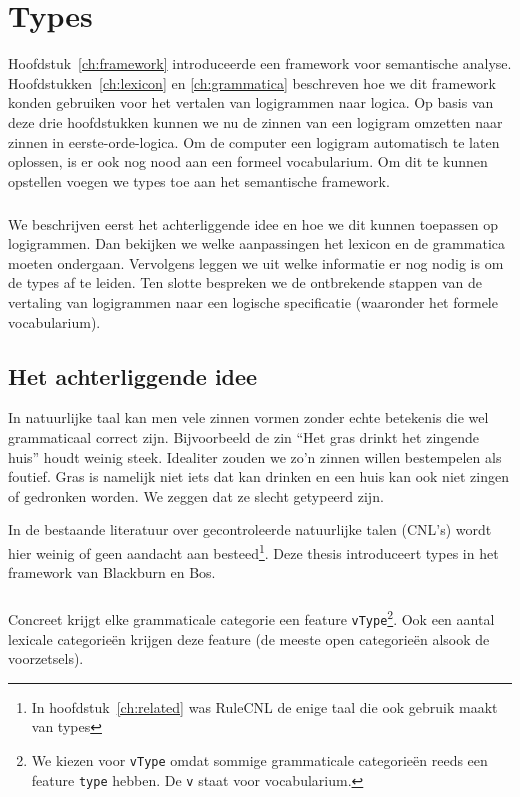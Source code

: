 \chapter{Types}
\label{ch:types}

Hoofdstuk~\ref{ch:framework} introduceerde een framework voor semantische analyse. Hoofdstukken~\ref{ch:lexicon} en \ref{ch:grammatica} beschreven hoe we dit framework konden gebruiken voor het vertalen van logigrammen naar logica. Op basis van deze drie hoofdstukken kunnen we nu de zinnen van een logigram omzetten naar zinnen in eerste-orde-logica. Om de computer een logigram automatisch te laten oplossen, is er ook nog nood aan een formeel vocabularium. Om dit te kunnen opstellen voegen we types toe aan het semantische framework.

\paragraph{} We beschrijven eerst het achterliggende idee en hoe we dit kunnen toepassen op logigrammen. Dan bekijken we welke aanpassingen het lexicon en de grammatica moeten ondergaan. Vervolgens leggen we uit welke informatie er nog nodig is om de types af te leiden. Ten slotte bespreken we de ontbrekende stappen van de vertaling van logigrammen naar een logische specificatie (waaronder het formele vocabularium).

\section{Het achterliggende idee}
In natuurlijke taal kan men vele zinnen vormen zonder echte betekenis die wel grammaticaal correct zijn. Bijvoorbeeld de zin ``Het gras drinkt het zingende huis'' houdt weinig steek. Idealiter zouden we zo'n zinnen willen bestempelen als foutief. Gras is namelijk niet iets dat kan drinken en een huis kan ook niet zingen of gedronken worden. We zeggen dat ze slecht getypeerd zijn.

In de bestaande literatuur over gecontroleerde natuurlijke talen (CNL's) wordt hier weinig of geen aandacht aan besteed\footnote{In hoofdstuk~\ref{ch:related} was RuleCNL de enige taal die ook gebruik maakt van types}. Deze thesis introduceert types in het framework van Blackburn en Bos. 

\paragraph{} Concreet krijgt elke grammaticale categorie een feature \texttt{vType}\footnote{We kiezen voor \texttt{vType} omdat sommige grammaticale categorieën reeds een feature \texttt{type} hebben. De \texttt{v} staat voor vocabularium.}. Ook een aantal lexicale categorieën krijgen deze feature (de meeste open categorieën alsook de voorzetsels).

